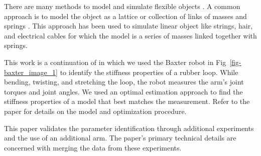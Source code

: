 \documentclass[runningheads,a4paper]{llncs}
\begin{document}
There are many methods to model and simulate flexible objects \cite{khalil_payeur} \cite{lang_etal}.  A common approach is to model the object as a lattice or collection of links of masses and springs \cite{sahari_etal} \cite{wakamatsu_etal}  \cite{khalil_payeur}.  This approach has been used to simulate linear object like strings, hair, and electrical cables for which the model is a series of masses linked together with springs. %


This work is a continuation of \cite{caldwell_coleman_correll} in which we used the Baxter robot in Fig~\ref{fig-baxter_image_1} to identify the stiffness properties of a rubber loop.  While bending, twisting, and stretching the loop, the robot measures the arm's joint torques and joint angles.  We used an optimal estimation approach to find the stiffness properties of a model that best matches the measurement.  Refer to the paper for details on the model and optimization procedure.

This paper validates the parameter identification through additional experiments and the use of an additional arm.  The paper's primary technical details are concerned with merging the data from these experiments.
\end{document}
